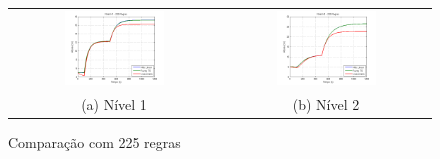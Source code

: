 \begin{figure}[H]
	\centering
	\begin{tabular}{cc}
		\includegraphics[width=0.5\textwidth,keepaspectratio]{img/h1_ts15.png} &
		\includegraphics[width=0.5\textwidth,keepaspectratio]{img/h2_ts15.png} \\
		(a) Nível 1 &
		(b) Nível 2
	\end{tabular}
	\caption{\label{imgTS15} Comparação com 225 regras}
\end{figure}

